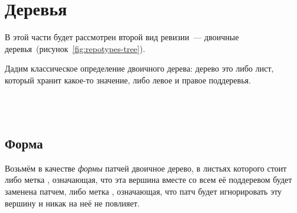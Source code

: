 \section{Деревья}


В этой части будет рассмотрен второй вид ревизии~--- двоичные
деревья~(рисунок~\ref{fig:repotypes-tree}).

Дадим классическое определение двоичного дерева: дерево это либо лист,
который хранит какое-то значение, либо левое и правое поддеревья.

\begin{code}%
\>  \AgdaSymbol{:}  \<%
\\
\>[0]\<[2]%
\>[2] \AgdaSymbol{:} \AgdaSymbol{(} \AgdaSymbol{:} \AgdaSymbol{)}  \<%
\\
\>[0]\<[2]%
\>[2] \AgdaSymbol{:} \AgdaSymbol{(}  \AgdaSymbol{:} \AgdaSymbol{)}  \<%
\end{code}
  
\subsection{Форма}

Возьмём в качестве \emph{формы} патчей двоичное дерево, в листьях
которого стоит либо метка , означающая,
что эта вершина вместе со всем её поддеревом будет заменена патчем,
либо метка , означающая, что патч будет
игнорировать эту вершину и никак на неё не повлияет.

